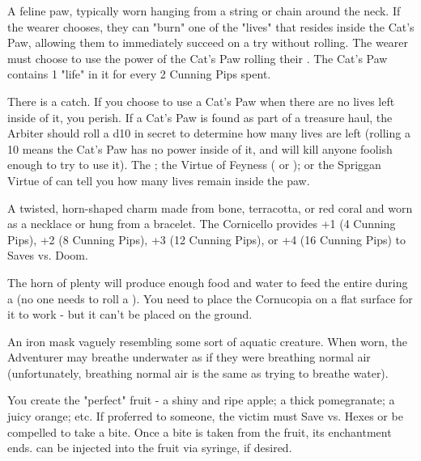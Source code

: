 A feline paw, typically worn hanging from a string or chain around the neck. If the wearer chooses, they can "burn" one of the "lives" that resides inside the Cat's Paw, allowing them to immediately succeed on a \DEATH try without rolling. The wearer must choose to use the power of the Cat's Paw  rolling their \DEATH. The Cat's Paw contains 1 "life" in it for every 2 Cunning Pips spent.

There is a catch. If you choose to use a Cat's Paw when there are no lives left inside of it, you  perish. If a Cat's Paw is found as part of a treasure haul, the Arbiter should roll a d10 in secret to determine how many lives are left (rolling a 10 means the Cat's Paw has no power inside of it, and will kill anyone foolish enough to try to use it). The ; the Virtue of Feyness ( or ); or the Spriggan Virtue of  can tell you how many lives remain inside the paw.


\MARVELS[
  Name=Cornicello,
  Link=marvels-cornicello,
  Pips=4+
]

A twisted, horn-shaped charm made from bone, terracotta, or red coral and worn as a necklace or hung from a bracelet. The Cornicello provides +1 (4 Cunning Pips), +2 (8 Cunning Pips), +3 (12 Cunning Pips), or +4 (16 Cunning Pips) to Saves vs. Doom.

\cbreak

\MARVELS[
  Name=Cornucopia,
  Link=marvels-cornucopia,
  Pips=4
]

The horn of plenty will produce enough food and water to feed the entire  during a  (no one needs to roll a  \UD).  You need to place the Cornucopia on a flat surface for it to work - but it can't be placed on the ground.

\MARVELS[
  Name=Fish Mask,
  Link=marvels-fish-mask,
  Pips=2
]

An iron mask vaguely resembling some sort of aquatic creature.  When worn, the Adventurer may breathe underwater as if they were breathing normal air (unfortunately, breathing normal air is the same as trying to breathe water).


\MARVELS[
  Name=Forbidden Fruit,
  Link=marvels-forbidden-fruit,
  Pips=8
]

You create the "perfect" fruit - a shiny and ripe apple; a thick pomegranate; a juicy orange; etc. If proferred to someone, the victim must Save vs. Hexes or be compelled to take a bite. Once a bite is taken from the fruit, its enchantment ends.  can be injected into the fruit via syringe, if desired.


